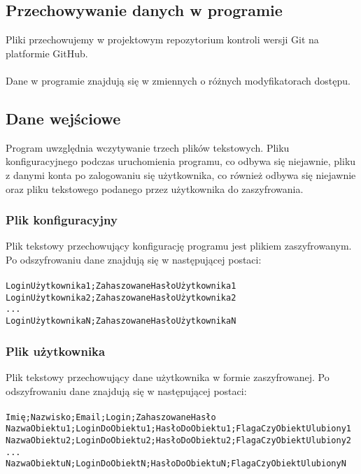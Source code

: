 \documentclass[a4paper]{article}
\newcommand{\prog}{\texttt}
\begin{document}
\subsection{Przechowywanie danych w programie}
Pliki przechowujemy w projektowym repozytorium kontroli wersji Git na platformie GitHub.\\ \\
Dane w programie znajdują się w zmiennych o różnych modyfikatorach dostępu.

\subsection{Dane wejściowe}
Program uwzględnia wczytywanie trzech plików tekstowych. Pliku konfiguracyjnego podczas uruchomienia programu, co odbywa się niejawnie, pliku z danymi konta po zalogowaniu się użytkownika, co również odbywa się niejawnie oraz pliku tekstowego podanego przez użytkownika do zaszyfrowania.

\subsubsection{Plik konfiguracyjny}\label{pKonf}
Plik tekstowy przechowujący konfigurację programu jest plikiem zaszyfrowanym. Po odszyfrowaniu dane znajdują się w następującej postaci:\\ \\
\prog{LoginUżytkownika1;ZahaszowaneHasłoUżytkownika1\\LoginUżytkownika2;ZahaszowaneHasłoUżytkownika2\\...\\LoginUżytkownikaN;ZahaszowaneHasłoUżytkownikaN}

\subsubsection{Plik użytkownika}\label{pUzy}
Plik tekstowy przechowujący dane użytkownika w formie zaszyfrowanej. Po odszyfrowaniu dane znajdują się w następującej postaci:\\ \\
\prog{Imię;Nazwisko;Email;Login;ZahaszowaneHasło\\NazwaObiektu1;LoginDoObiektu1;HasłoDoObiektu1;FlagaCzyObiektUlubiony1\\NazwaObiektu2;LoginDoObiektu2;HasłoDoObiektu2;FlagaCzyObiektUlubiony2\\...\\NazwaObiektuN;LoginDoObiektN;HasłoDoObiektuN;FlagaCzyObiektUlubionyN}
\end{document}

